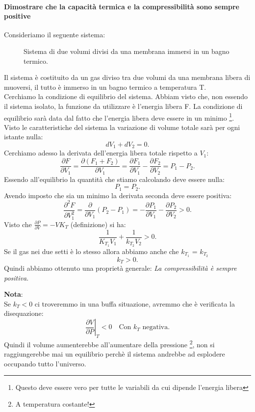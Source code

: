 \paragraph{Dimostrare che la capacità termica e la compressibilità sono sempre positive}%
Consideriamo il seguente sistema:
\begin{figure}[H]
    \centering
    \caption{Sistema di due volumi divisi da una membrana immersi in un bagno termico.}
    \label{fig:cvpositiva}
\end{figure}
\noindent
Il sistema è costituito da un gas diviso tra due volumi da una membrana libera di muoversi, il tutto è immerso in un bagno termico a temperatura T. \\
Cerchiamo la condizione di equilibrio del sistema. Abbiam visto che, non essendo il sistema isolato, la funzione da utilizzare è l'energia libera F. La condizione di equilibrio sarà data dal fatto che l'energia libera deve essere in un minimo \footnote{Questo deve essere vero per tutte le variabili da cui dipende l'energia libera}. \\
Visto le caratteristiche del sistema la variazione di volume totale sarà per ogni istante nulla:
\[
	dV_1 + dV_2= 0
.\] 
Cerchiamo adesso la derivata dell'energia libera totale rispetto a $V_1$:
\[
	\frac{\partial F}{\partial V_1} = \frac{\partial \left( F_1+F_2 \right) }{\partial V_1} = \frac{\partial F_1}{\partial V_1} - \frac{\partial F_2}{\partial V_2}= P_1 - P_2 
.\] 
Essendo all'equilibrio la quantità che stiamo calcolando deve essere nulla:
\[
	P_1 = P_2
.\] 
Avendo imposto che sia un minimo la derivata seconda deve essere positiva:
\[
	\frac{\partial ^2 F}{\partial V_1^2} = \frac{\partial }{\partial V_1} \left( P_2-P_1 \right) = - \frac{\partial P_1}{\partial V_1} - \frac{\partial P_2}{\partial V_2} >0
.\] 
Visto che $\frac{\partial P}{\partial V} = -VK_{T}$ (definizione) si ha:
\[
	\frac{1}{K_{T_1}V_1} + \frac{1}{k_{T_2}V_2} >0
.\] 
Se il gas nei due setti è lo stesso allora abbiamo anche che $k_{T_1}$ = $k_{T_2}$
\[
	k_{T} >0
.\] 
Quindi abbiamo ottenuto una proprietà generale: \textit{La compressibilità è sempre positiva}. \\
\begin{framed}
\noindent \textbf{Nota}: \\
Se $k_{T}<0$ ci troveremmo in una buffa situazione, avremmo che è verificata la disequazione:
\[
	\left.\frac{\partial V}{\partial P} \right|_{T}<0 \quad \text{Con $k_{T}$ negativa}
.\] 
Quindi il volume aumenterebbe all'aumentare della pressione \footnote{A temperatura costante!}, non si raggiungerebbe mai un equilibrio perchè il sistema andrebbe ad esplodere occupando tutto l'universo.\\
\end{framed}
